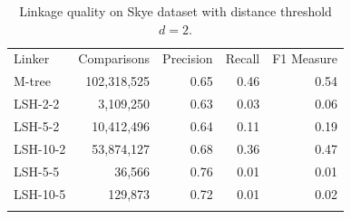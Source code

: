 \documentclass{llncs}
\begin{document}
\begin{table}[ht]
\caption{Linkage quality on Skye dataset with distance threshold
$d= 2$.}
\label{comparison-of-results-demography-skye}
\centering
\begin{footnotesize}
\begin{tabular}{lrrrr} \hline\noalign{\smallskip}
\parbox{0.2\textwidth}{\centering Linker} &
\parbox{0.2\textwidth}{\centering Comparisons} &
\parbox{0.17\textwidth}{\centering Precision} &
\parbox{0.17\textwidth}{\centering Recall} &
\parbox{0.17\textwidth}{\centering F1 Measure} \\
\noalign{\smallskip} \hline \noalign{\smallskip}
M-tree    & 102,318,525                 & 0.65      & 0.46   & 0.54      \\ \hline
\noalign{\smallskip} \hline \noalign{\smallskip}
LSH-2-2  & 3,109,250                   & 0.63      & 0.03   & 0.06       \\

LSH-5-2  & 10,412,496                  & 0.64      & 0.11   & 0.19       \\

LSH-10-2 & 53,874,127                  & 0.68      & 0.36   & 0.47       \\

LSH-5-5  & 36,566                     & 0.76      & 0.01   & 0.01       \\

LSH-10-5 & 129,873                    & 0.72      & 0.01   & 0.02       \\
\noalign{\smallskip} \hline
\end{tabular}
\end{footnotesize}
\end{table}

\end{document}
